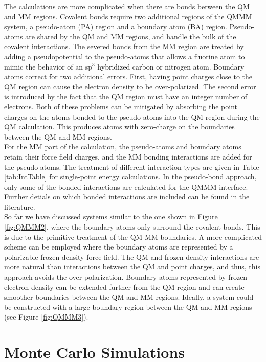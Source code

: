 \documentclass[12pt]{report}
\begin{document}
The calculations are more complicated when there are bonds between the QM and
MM regions. Covalent bonds require two additional regions of the QMMM system,
a pseudo-atom (PA) region and a boundary atom (BA) region. Pseudo-atoms are
shared by the QM and MM regions, and handle the bulk of the covalent
interactions. The severed bonds from the MM region are treated by adding a
pseudopotential to the pseudo-atoms that allows a fluorine atom to mimic the
behavior of an sp$^3$ hybridized carbon or nitrogen atom. Boundary atoms
correct for two additional errors. First, having point charges close to the
QM region can cause the electron density to be over-polarized. The second
error is introduced by the fact that the QM region must have an integer number
of electrons. Both of these problems can be mitigated by absorbing the point
charges on the atoms bonded to the pseudo-atoms into the QM region during the
QM calculation. This produces atoms with zero-charge on the boundaries between
the QM and MM regions. \\

For the MM part of the calculation, the pseudo-atoms and boundary atoms retain
their force field charges, and the MM bonding interactions are added for the
pseudo-atoms. The treatment of different interaction types are given in Table
\ref{tab:IntTable} for single-point energy calculations. In the pseudo-bond
approach, only some of the bonded interactions are calculated for the QMMM
interface. Further detials on which bonded interactions are included can be
found in the literature. \\

So far we have discussed systems similar to the one shown in Figure
\ref{fig:QMMM2}, where the boundary atoms only surround the covalent bonds.
This is due to the primitive treatment of the QM-MM boundaries. A more
complicated scheme can be employed where the boundary atoms are represented by
a polarizable frozen density force field. The QM and frozen density
interactions are more natural than interactions between the QM and point
charges, and thus, this approach avoids the over-polarization. Boundary atoms
represented by frozen electron density can be extended further from the QM
region and can create smoother boundaries between the QM and MM regions.
Ideally, a system could be constructed with a large boundary region between
the QM and MM regions (see Figure \ref{fig:QMMM3}).

\FloatBarrier

\section{Monte Carlo Simulations}
\end{document}
